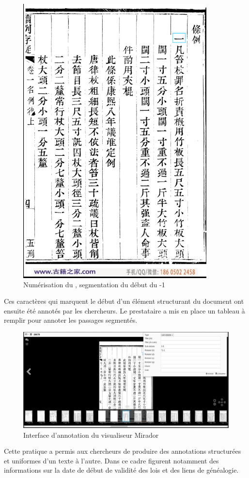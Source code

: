 \newpage
\begin{figure}[h]
    \centering
    \includegraphics[width=100mm]{images/image2.png}
    \caption{Numérisation du \dc, segmentation du début du -1}
\end{figure}

Ces caractères qui marquent le début d'un élément structurant du document ont ensuite été annotés par les chercheurs. Le prestataire a mis en place un tableau à remplir pour annoter les passages segmentés. 

\begin{figure}[h]
    \centering
    \includegraphics[width=\textwidth]{images/image3.png}
    \caption{Interface d'annotation du visualiseur Mirador}
\end{figure}
Cette pratique a permis aux chercheurs de produire des annotations structurées et uniformes d'un texte à l'autre. Dans ce cadre figurent notamment des informations sur la date de début de validité des lois et des liens de généalogie. 


